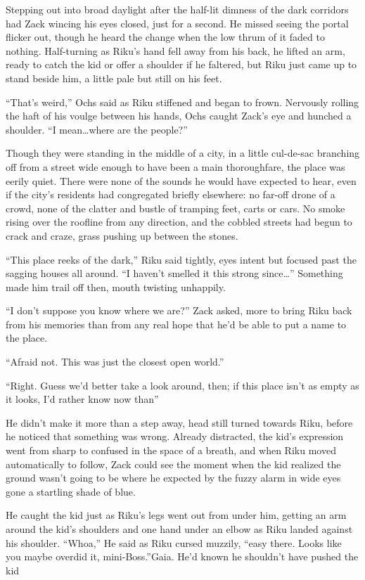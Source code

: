 Stepping out into broad daylight after the half-lit dimness of the dark corridors had Zack wincing his eyes closed, just for a second. He missed seeing the portal flicker out, though he heard the change when the low thrum of it faded to nothing. Half-turning as Riku's hand fell away from his back, he lifted an arm, ready to catch the kid or offer a shoulder if he faltered, but Riku just came up to stand beside him, a little pale but still on his feet.

``That's weird,'' Ochs said as Riku stiffened and began to frown. Nervously rolling the haft of his voulge between his hands, Ochs caught Zack's eye and hunched a shoulder. ``I mean\ldots where are the people?''

Though they were standing in the middle of a city, in a little cul-de-sac branching off from a street wide enough to have been a main thoroughfare, the place was eerily quiet. There were none of the sounds he would have expected to hear, even if the city's residents had congregated briefly elsewhere: no far-off drone of a crowd, none of the clatter and bustle of tramping feet, carts or cars. No smoke rising over the roofline from any direction, and the cobbled streets had begun to crack and craze, grass pushing up between the stones.

``This place reeks of the dark,'' Riku said tightly, eyes intent but focused past the sagging houses all around. ``I haven't smelled it this strong since\ldots'' Something made him trail off then, mouth twisting unhappily.

``I don't suppose you know where we are?'' Zack asked, more to bring Riku back from his memories than from any real hope that he'd be able to put a name to the place.

``Afraid not. This was just the closest open world.''

``Right. Guess we'd better take a look around, then; if this place isn't as empty as it looks, I'd rather know now than\textemdash ''

He didn't make it more than a step away, head still turned towards Riku, before he noticed that something was wrong. Already distracted, the kid's expression went from sharp to confused in the space of a breath, and when Riku moved automatically to follow, Zack could see the moment when the kid realized the ground wasn't going to be where he expected by the fuzzy alarm in wide eyes gone a startling shade of blue.

He caught the kid just as Riku's legs went out from under him, getting an arm around the kid's shoulders and one hand under an elbow as Riku landed against his shoulder. ``Whoa,'' He said as Riku cursed muzzily, ``easy there. Looks like you maybe overdid it, mini-Boss.''Gaia. He'd known he shouldn't have pushed the kid\textemdash 

